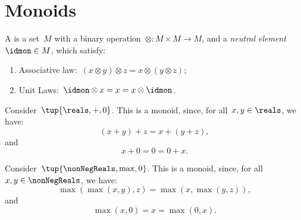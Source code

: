 

\section{Monoids}\label{sec:parallelism-monoids}

\begin{definition}[Monoid]
  \label{def:monoid}
  A  is a set~$M$ with a binary operation~$\otimes \colon M\times M\to M$, and a \emph{neutral element}~$\idmon\in M$, which satisfy:
  \begin{enumerate}
    \item Associative law:~$(x\otimes y)\otimes z=x\otimes (y\otimes z)$;
    \item Unit Laws:~$\idmon\otimes x=x=x\otimes \idmon$.
  \end{enumerate}
\end{definition}
\begin{example}
  Consider~$\tup{\reals,+,0}$. This is a monoid, since, for all~$x,y\in \reals$, we have:
  \begin{equation*}
  (x+y)
    +z=x+(y+z),
  \end{equation*}
  and
  \begin{equation*}
    x+0=0=0+x.
  \end{equation*}
\end{example}

\begin{example}
  Consider~$\tup{\nonNegReals,\max,0}$. This is a monoid, since, for all~$x,y\in \nonNegReals$, we have:
  \begin{equation*}
    \max(\max(x,y),z)=\max(x,\max(y,z)),
  \end{equation*}
  and
  \begin{equation*}
    \max(x,0)=x=\max(0,x).
  \end{equation*}
\end{example}


